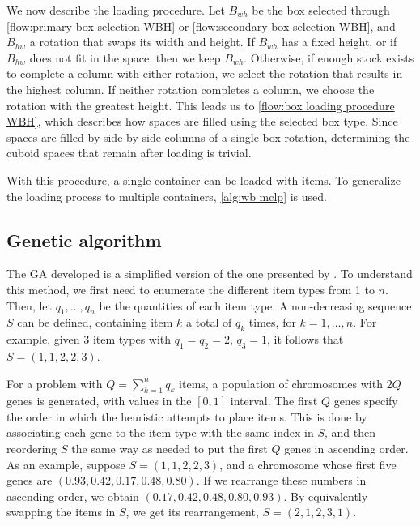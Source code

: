 

We now describe the loading procedure. Let $B_{wh}$ be the box selected through \cref{flow:primary box selection WBH} or \cref{flow:secondary box selection WBH}, and $B_{hw}$ a rotation that swaps its width and height. If $B_{wh}$ has a fixed height, or if $B_{hw}$ does not fit in the space, then we keep $B_{wh}$. Otherwise, if enough stock exists to complete a column with either rotation, we select the rotation that results in the highest column. If neither rotation completes a column, we choose the rotation with the greatest height. This leads us to \cref{flow:box loading procedure WBH}, which describes how spaces are filled using the selected box type. Since spaces are filled by side-by-side columns of a single box rotation, determining the cuboid spaces that remain after loading is trivial.



With this procedure, a single container can be loaded with items. To generalize the loading process to multiple containers, \cref{alg:wb mclp} is used.



\subsection{Genetic algorithm}

The GA developed is a simplified version of the one presented by \textcite{GONÇALVES2011}. To understand this method, we first need to enumerate the different item types from 1 to $n$. Then, let $q_1, \dots, q_n$ be the quantities of each item type. A non-decreasing sequence $S$ can be defined, containing item $k$ a total of $q_k$ times, for $k = 1,\dots,n$. For example, given 3 item types with $q_1 = q_2 = 2$, $q_3 = 1$, it follows that $S = (1, 1, 2, 2, 3)$.

For a problem with $Q = \sum_{k=1}^{n}q_k$ items, a population of chromosomes with $2Q$ genes is generated, with values in the $[0, 1]$ interval. The first $Q$ genes specify the order in which the heuristic attempts to place items. This is done by associating each gene to the item type with the same index in $S$, and then reordering $S$ the same way as needed to put the first $Q$ genes in ascending order. As an example, suppose $S = (1, 1, 2, 2, 3)$, and a chromosome whose first five genes are $(0.93, 0.42, 0.17, 0.48, 0.80)$. If we rearrange these numbers in ascending order, we obtain $(0.17, 0.42, 0.48, 0.80, 0.93)$. By equivalently swapping the items in $S$, we get its rearrangement, $\bar{S} = (2, 1, 2, 3, 1)$.

